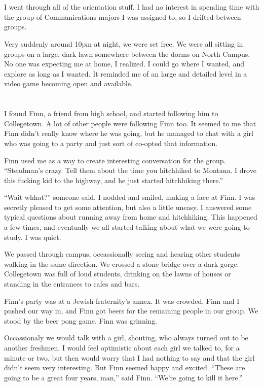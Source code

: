 \section{}

I went through all of the orientation stuff.  I had no interest in spending
time with the group of Communications majors I was assigned to, so I drifted
between groups. 

Very suddenly around 10pm at night, we were set free.  We were all sitting in
groups on a large, dark lawn somewhere between the dorms on North Campus.  No
one was expecting me at home, I realized.  I could go where I wanted, and
explore as long as I wanted.  It reminded me of an large and detailed level in a
video game becoming open and available.

\section{}

I found Finn, a friend from high school, and started following him to
Collegetown.  A lot of other people were following Finn too.  It seemed to me
that Finn didn't really know where he was going, but he managed to chat with a
girl who was going to a party and just sort of co-opted that information.  

Finn used me as a way to create interesting conversation for the group.
``Steadman's crazy.  Tell them about the time you hitchhiked to Montana.  I
drove this fucking kid to the highway, and he just started hitchhiking there.''

``Wait whhat?'' someone said.  I nodded and smiled, making a face at Finn.  I
was secretly pleased to get some attention, but also a little uneasy.  I
answered some typical questions about running away from home and hitchhiking.
This happened a few times, and eventually we all started talking about what we
were going to study.  I was quiet. 

We passed through campus, occassionally seeing and hearing other students
walking in the same direction.  We crossed a stone bridge over a dark gorge.
Collegetown was full of loud students, drinking on the lawns of houses or
standing in the entrances to cafes and bars.

Finn's party was at a Jewish fraternity's annex.  It was crowded.  Finn and I
pushed our way in, and Finn got beers for the remaining people in our group.  We
stood by the beer pong game.  Finn was grinning.

Occassionaly we would talk with a girl, shouting, who always turned out to be
another freshmen.  I would feel optimistic about each girl we talked to, for a
minute or two, but then would worry that I had nothing to say and that the girl
didn't seem very interesting.  But Finn seemed happy and excited.  ``These are
going to be a great four years, man,'' said Finn.  ``We're going to kill it
here.''

